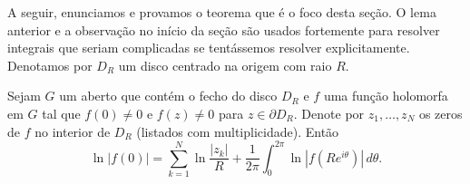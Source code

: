     \medskip 
    
    
    A seguir, enunciamos e provamos o teorema que é o foco desta seção. O lema
    anterior e a observação no início da seção são usados fortemente para resolver
    integrais que seriam complicadas se tentássemos resolver explicitamente. 
    Denotamos por $D_R$ um disco centrado na origem com raio $R$.
    \begin{teorema}
    \label{teo:form-jensen}
        Sejam $G$ um aberto que contém o fecho do disco $D_R$ e $f$ uma função
        holomorfa em $G$ tal que $f(0) \neq 0$ e $f(z) \neq 0$ para 
        $z \in \partial D_R$. Denote por $z_1, \dots, z_N$ os zeros de $f$ no 
        interior de $D_R$ (listados com multiplicidade). 
        Então
        \begin{equation}
        \label{eq-formula-jensen}
            \ln{|f(0)|} = \sum_{k = 1}^{N}\ln{\frac{|z_k|}{R}} 
            + \frac{1}{2\pi}\int_{0}^{2\pi}\ln{|f(Re^{i\theta})|} \, d\theta.
        \end{equation}
    \end{teorema}
